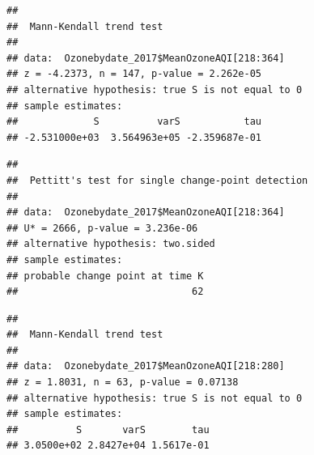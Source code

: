 \documentclass[12pt,]{article}
\newenvironment{Shaded}{\begin{snugshade}}{\end{snugshade}}
\newcommand{\KeywordTok}[1]{\textcolor[rgb]{0.13,0.29,0.53}{\textbf{#1}}}
\newcommand{\DecValTok}[1]{\textcolor[rgb]{0.00,0.00,0.81}{#1}}
\newcommand{\CommentTok}[1]{\textcolor[rgb]{0.56,0.35,0.01}{\textit{#1}}}
\newcommand{\OperatorTok}[1]{\textcolor[rgb]{0.81,0.36,0.00}{\textbf{#1}}}
\newcommand{\NormalTok}[1]{#1}
\begin{document}
\begin{Shaded}
\end{Shaded}

\begin{verbatim}
## 
##  Mann-Kendall trend test
## 
## data:  Ozonebydate_2017$MeanOzoneAQI[218:364]
## z = -4.2373, n = 147, p-value = 2.262e-05
## alternative hypothesis: true S is not equal to 0
## sample estimates:
##             S          varS           tau 
## -2.531000e+03  3.564963e+05 -2.359687e-01
\end{verbatim}

\begin{Shaded}
\end{Shaded}

\begin{verbatim}
## 
##  Pettitt's test for single change-point detection
## 
## data:  Ozonebydate_2017$MeanOzoneAQI[218:364]
## U* = 2666, p-value = 3.236e-06
## alternative hypothesis: two.sided
## sample estimates:
## probable change point at time K 
##                              62
\end{verbatim}

\begin{Shaded}
\end{Shaded}

\begin{verbatim}
## 
##  Mann-Kendall trend test
## 
## data:  Ozonebydate_2017$MeanOzoneAQI[218:280]
## z = 1.8031, n = 63, p-value = 0.07138
## alternative hypothesis: true S is not equal to 0
## sample estimates:
##          S       varS        tau 
## 3.0500e+02 2.8427e+04 1.5617e-01
\end{verbatim}
\end{document}
